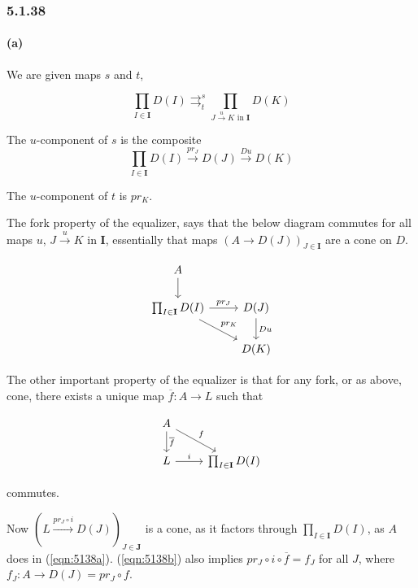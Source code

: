 \documentclass{article}
\begin{document}
\subsubsection*{5.1.38}
\paragraph{(a)}

We are given maps $s$ and $t$,

\begin{equation*}
  \prod_{I \in \mathbf{I}} D(I) \mathop{\rightrightarrows}_t^{s} \prod_{J \xrightarrow{u} K \text{ in } \mathbf{I}} D(K)
\end{equation*}

The $u$-component of $s$ is the composite
\begin{equation*}
  \prod_{I \in \mathbf{I}}D(I) \xrightarrow{pr_J} D(J) \xrightarrow{Du} D(K)
\end{equation*}

The $u$-component of $t$ is $pr_K$.

The fork property of the equalizer, says that the below diagram commutes for all maps $u$, $J \xrightarrow{u} K \text{ in } \mathbf{I}$, essentially that maps $(A \rightarrow D(J))_{J \in \mathbf{I}}$ are a cone on $D$.

\begin{equation}
\label{eqn:5138a}
\begin{tikzcd}
  A \arrow{d} &\\
  \prod_{I \in \mathbf{I}}D(I) \arrow{r}{pr_J} \arrow{rd}{pr_K}
  & D(J) \arrow{d}{Du} \\
    & D(K)
  \end{tikzcd}
\end{equation}

The other important property of the equalizer is that for any fork, or as above, cone, there exists a unique map $\overline{f} \colon A \rightarrow L$ such that

\begin{equation}
\label{eqn:5138b}
\begin{tikzcd}
  A \arrow{d}{\overline{f}} \arrow{dr}{f} & \\
  L \arrow{r}{i} & \prod_{I \in \mathbf{I}}D(I)
\end{tikzcd}
\end{equation}

commutes.

Now $(L \xrightarrow{pr_J \circ i} D(J))_{J \in \mathbf{J}}$ is a cone, as it factors through $\prod_{I \in \mathbf{I}}D(I)$, as $A$ does in (\ref{eqn:5138a}). (\ref{eqn:5138b}) also implies $pr_J \circ i \circ \overline{f} = f_J$ for all $J$, where $f_J \colon A \rightarrow D(J) = pr_J \circ f$.
\end{document}
